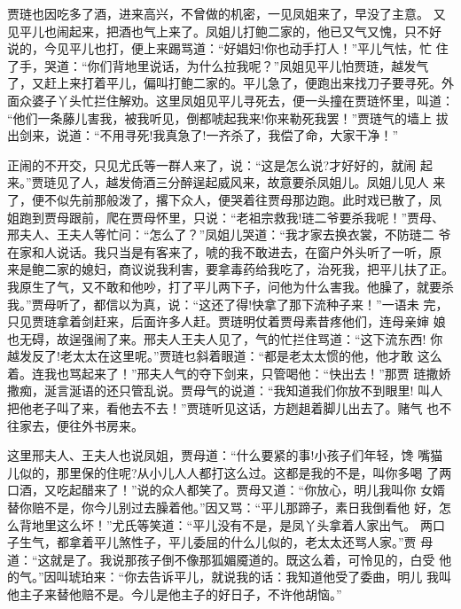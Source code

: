 贾琏也因吃多了酒，进来高兴，不曾做的机密，一见凤姐来了，早没了主意。
又见平儿也闹起来，把酒也气上来了。凤姐儿打鲍二家的，他已又气又愧，只不好
说的，今见平儿也打，便上来踢骂道：“好娼妇!你也动手打人！”平儿气怯，忙
住了手，哭道：“你们背地里说话，为什么拉我呢？”凤姐见平儿怕贾琏，越发气
了，又赶上来打着平儿，偏叫打鲍二家的。平儿急了，便跑出来找刀子要寻死。外
面众婆子丫头忙拦住解劝。这里凤姐见平儿寻死去，便一头撞在贾琏怀里，叫道：
“他们一条藤儿害我，被我听见，倒都唬起我来!你来勒死我罢！”贾琏气的墙上
拔出剑来，说道：“不用寻死!我真急了!一齐杀了，我偿了命，大家干净！”

正闹的不开交，只见尤氏等一群人来了，说：“这是怎么说?才好好的，就闹
起来。”贾琏见了人，越发倚酒三分醉逞起威风来，故意要杀凤姐儿。凤姐儿见人
来了，便不似先前那般泼了，撂下众人，便哭着往贾母那边跑。此时戏已散了，凤
姐跑到贾母跟前，爬在贾母怀里，只说：“老祖宗救我!琏二爷要杀我呢！”贾母、
邢夫人、王夫人等忙问：“怎么了？”凤姐儿哭道：“我才家去换衣裳，不防琏二
爷在家和人说话。我只当是有客来了，唬的我不敢进去，在窗户外头听了一听，原
来是鲍二家的媳妇，商议说我利害，要拿毒药给我吃了，治死我，把平儿扶了正。
我原生了气，又不敢和他吵，打了平儿两下子，问他为什么害我。他臊了，就要杀
我。”贾母听了，都信以为真，说：“这还了得!快拿了那下流种子来！”一语未
完，只见贾琏拿着剑赶来，后面许多人赶。贾琏明仗着贾母素昔疼他们，连母亲婶
娘也无碍，故逞强闹了来。邢夫人王夫人见了，气的忙拦住骂道：“这下流东西!
你越发反了!老太太在这里呢。”贾琏乜斜着眼道：“都是老太太惯的他，他才敢
这么着。连我也骂起来了！”邢夫人气的夺下剑来，只管喝他：“快出去！”那贾
琏撒娇撒痴，涎言涎语的还只管乱说。贾母气的说道：“我知道我们你放不到眼里!
叫人把他老子叫了来，看他去不去！”贾琏听见这话，方趔趄着脚儿出去了。赌气
也不往家去，便往外书房来。

这里邢夫人、王夫人也说凤姐，贾母道：“什么要紧的事!小孩子们年轻，馋
嘴猫儿似的，那里保的住呢?从小儿人人都打这么过。这都是我的不是，叫你多喝
了两口酒，又吃起醋来了！”说的众人都笑了。贾母又道：“你放心，明儿我叫你
女婿替你赔不是，你今儿别过去臊着他。”因又骂：“平儿那蹄子，素日我倒看他
好，怎么背地里这么坏！”尤氏等笑道：“平儿没有不是，是凤丫头拿着人家出气。
两口子生气，都拿着平儿煞性子，平儿委屈的什么儿似的，老太太还骂人家。”贾
母道：“这就是了。我说那孩子倒不像那狐媚魇道的。既这么着，可怜见的，白受
他的气。”因叫琥珀来：“你去告诉平儿，就说我的话：我知道他受了委曲，明儿
我叫他主子来替他赔不是。今儿是他主子的好日子，不许他胡恼。”

